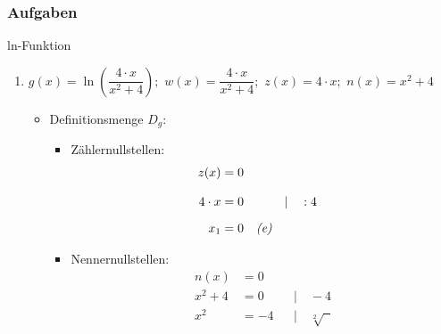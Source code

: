 
\subsubsection{Aufgaben}
\vspace{1.0ex}
\begin{Exercise}{ln-Funktion}{}
    \begin{enumerate}
    \item [b)]{
        $g(x) = \ln\left(\dfrac{4 \cdot x}{x^{2} + 4}\right);$ \qquad $w(x) = \dfrac{4 \cdot x}{x^{2} + 4};$ \qquad $z(x) = 4 \cdot x;$ \qquad $n(x) = x^{2} + 4$\\[-2.0ex]
        \begin{itemize}[leftmargin=*]
            \item Definitionsmenge $D_{g}$:\\[2.0ex]{
                \vspace{-2.0ex}
                \begin{minipage}[t]{0.45\linewidth}
                    \begin{itemize}
                        \item Zählernullstellen:\\[-2.0ex]{
                            \begin{align*}
                                z(x) &= 0 \\[2.0ex]
                                4 \cdot x &= 0 &&| \quad :4\\[1.5ex]
                                x_{1} &= 0 \quad \text{\textit{(e)}}&&
                            \end{align*}
                            }
                    \end{itemize}
                \end{minipage}
                \hfill
                \begin{minipage}[t]{0.45\linewidth}
                    \begin{itemize}
                        \item Nennernullstellen:\\[-2.0ex]{
                            \begin{align*}
                                n(x) &= 0 \\[2.0ex]
                                x^{2} + 4 &= 0 &&| \quad -4\\[1.5ex]
                                x^{2} &= -4 &&| \quad \sqrt[2]{\phantom{x}}\\[1.5ex]

\end{align*}}
\end{itemize}
\end{minipage}}
\end{itemize}}
\end{enumerate}
\end{Exercise}
